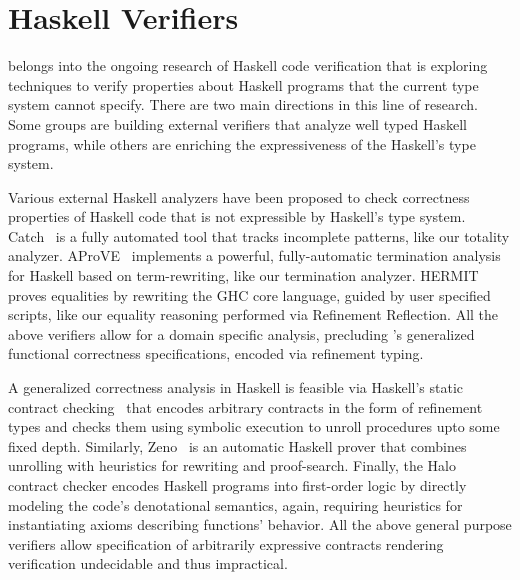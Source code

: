 \section{Haskell Verifiers}\label{related:haskell}

\toolname belongs into the ongoing research of Haskell code verification
that is exploring techniques to verify properties about Haskell programs
that the current type system cannot specify. 
%
There are two main directions in this line of research. 
%
Some groups are building external verifiers that analyze 
well typed Haskell programs, while others are enriching 
the expressiveness of the Haskell's type system. 

Various external Haskell analyzers have been proposed 
to check correctness properties of Haskell code that 
is not expressible by Haskell's type system. 
%
Catch~\cite{catch} is
a fully automated tool that tracks incomplete patterns,
like our totality analyzer. 
AProVE~\cite{Giesl11} implements a powerful, fully-automatic
termination analysis for Haskell based on term-rewriting,
like our termination analyzer. 
HERMIT~\citep{Farmer15} proves equalities by rewriting
the GHC core language, guided by user specified scripts, 
like our equality reasoning performed via Refinement Reflection.
%
All the above verifiers allow for a domain specific analysis, 
precluding \toolname's generalized functional 
correctness specifications, encoded via refinement typing. 
%

A generalized correctness analysis in Haskell is feasible 
via Haskell's static contract checking~\cite{XuPOPL09} 
that encodes arbitrary contracts in the form of refinement types and
checks them using symbolic execution to unroll procedures
upto some fixed depth.
%
Similarly, Zeno~\cite{ZENO} is an automatic Haskell 
prover that combines unrolling with heuristics for rewriting
and proof-search. 
%
Finally, the Halo~\cite{halo} contract checker encodes 
Haskell programs into first-order logic by directly 
modeling the code's denotational semantics,
again, requiring heuristics for instantiating axioms 
describing functions' behavior.
%
All the above general purpose verifiers 
allow specification of arbitrarily expressive contracts
rendering verification undecidable and thus impractical. 


 
 
